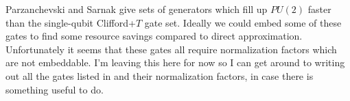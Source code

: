 \documentclass{article}
\theoremstyle{definition}
\newtheorem{definition}{Definition}
\theoremstyle{theorem}
\theoremstyle{remark}
\begin{document}
Parzanchevski and Sarnak \cite{supergoldengates} give sets of generators which fill up $PU(2)$ faster than the single-qubit Clifford+$T$ gate set. Ideally we could embed some of these gates to find some resource savings compared to direct approximation. Unfortunately it seems that these gates all require normalization factors which are not embeddable. I'm leaving this here for now so I can get around to writing out all the gates listed in \cite{supergoldengates} and their normalization factors, in case there is something useful to do.
%
%
\end{document}
